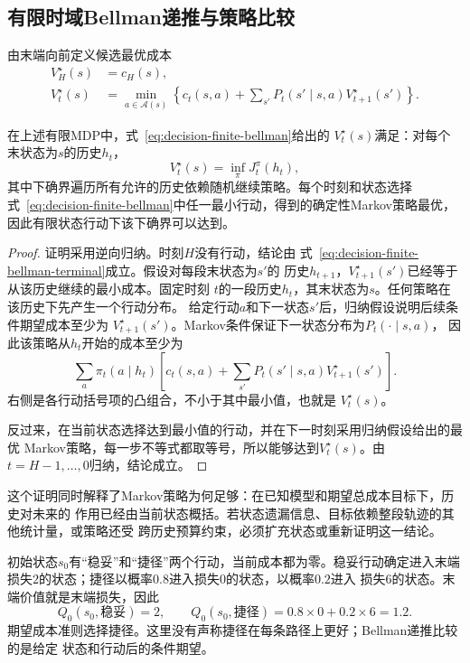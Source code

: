 \subsection{有限时域Bellman递推与策略比较}
由末端向前定义候选最优成本
\begin{align}
  V_H^\star(s)
  &=
  c_H(s),
  \label{eq:decision-finite-bellman-terminal}\\
  V_t^\star(s)
  &=
  \min_{a\in\mathcal{A}(s)}
  \left\{
    c_t(s,a)
    +
    \sum_{s'}P_t(s'\mid s,a)V_{t+1}^\star(s')
  \right\}.
  \label{eq:decision-finite-bellman}
\end{align}

\begin{theorem}[有限时域最优性原理]
\label{thm:decision-finite-horizon-optimality}
在上述有限MDP中，式~\eqref{eq:decision-finite-bellman}给出的
\(V_t^\star(s)\)满足：对每个末状态为\(s\)的历史\(h_t\)，
\[
  V_t^\star(s)=\inf_\pi J_t^\pi(h_t),
\]
其中下确界遍历所有允许的历史依赖随机继续策略。每个时刻和状态选择
式~\eqref{eq:decision-finite-bellman}中任一最小行动，得到的确定性Markov策略最优，
因此有限状态行动下该下确界可以达到。
\end{theorem}

\begin{proof}
证明采用逆向归纳。时刻\(H\)没有行动，结论由
式~\eqref{eq:decision-finite-bellman-terminal}成立。假设对每段末状态为\(s'\)的
历史\(h_{t+1}\)，\(V_{t+1}^\star(s')\)已经等于从该历史继续的最小成本。固定时刻
\(t\)的一段历史\(h_t\)，其末状态为\(s\)。任何策略在该历史下先产生一个行动分布。
给定行动\(a\)和下一状态\(s'\)后，归纳假设说明后续条件期望成本至少为
\(V_{t+1}^\star(s')\)。Markov条件保证下一状态分布为\(P_t(\cdot\mid s,a)\)，
因此该策略从\(h_t\)开始的成本至少为
\[
  \sum_a\pi_t(a\mid h_t)
  \left[
    c_t(s,a)+
    \sum_{s'}P_t(s'\mid s,a)V_{t+1}^\star(s')
  \right].
\]
右侧是各行动括号项的凸组合，不小于其中最小值，也就是
\(V_t^\star(s)\)。

反过来，在当前状态选择达到最小值的行动，并在下一时刻采用归纳假设给出的最优
Markov策略，每一步不等式都取等号，所以能够达到\(V_t^\star(s)\)。由
\(t=H-1,\ldots,0\)归纳，结论成立。
\end{proof}

这个证明同时解释了Markov策略为何足够：在已知模型和期望总成本目标下，历史对未来的
作用已经由当前状态概括。若状态遗漏信息、目标依赖整段轨迹的其他统计量，或策略还受
跨历史预算约束，必须扩充状态或重新证明这一结论。

\begin{example}[两阶段路线选择]
\label{ex:decision-two-stage-route}
初始状态\(s_0\)有“稳妥”和“捷径”两个行动，当前成本都为零。稳妥行动确定进入末端
损失\(2\)的状态；捷径以概率\(0.8\)进入损失\(0\)的状态，以概率\(0.2\)进入
损失\(6\)的状态。末端价值就是末端损失，因此
\[
  Q_0(s_0,\text{稳妥})=2,
  \qquad
  Q_0(s_0,\text{捷径})=0.8\times0+0.2\times6=1.2.
\]
期望成本准则选择捷径。这里没有声称捷径在每条路径上更好；Bellman递推比较的是给定
状态和行动后的条件期望。
\end{example}

